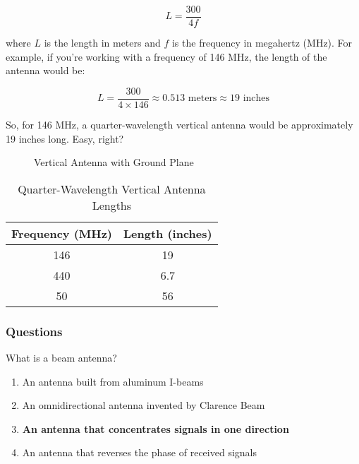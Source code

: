 \begin{equation}
L = \frac{300}{4f}
\end{equation}

where \( L \) is the length in meters and \( f \) is the frequency in megahertz (MHz). For example, if you're working with a frequency of 146 MHz, the length of the antenna would be:

\begin{equation}
L = \frac{300}{4 \times 146} \approx 0.513 \text{ meters} \approx 19 \text{ inches}
\end{equation}

So, for 146 MHz, a quarter-wavelength vertical antenna would be approximately 19 inches long. Easy, right?

\begin{figure}[h]
    \centering
    \caption{Vertical Antenna with Ground Plane}
    \label{fig:vertical-antenna}
\end{figure}

\begin{table}[h]
    \centering
    \begin{tabular}{|c|c|}
        \hline
        Frequency (MHz) & Length (inches) \\
        \hline
        146 & 19 \\
        440 & 6.7 \\
        50 & 56 \\
        \hline
    \end{tabular}
    \caption{Quarter-Wavelength Vertical Antenna Lengths}
    \label{tab:vertical-lengths}
\end{table}

\subsubsection{Questions}

\begin{tcolorbox}[colback=gray!10!white,colframe=black!75!black,title={T9A01}]
    What is a beam antenna?
    \begin{enumerate}[label=\Alph*),noitemsep]
        \item An antenna built from aluminum I-beams
        \item An omnidirectional antenna invented by Clarence Beam
        \item \textbf{An antenna that concentrates signals in one direction}
        \item An antenna that reverses the phase of received signals
    \end{enumerate}
\end{tcolorbox}

